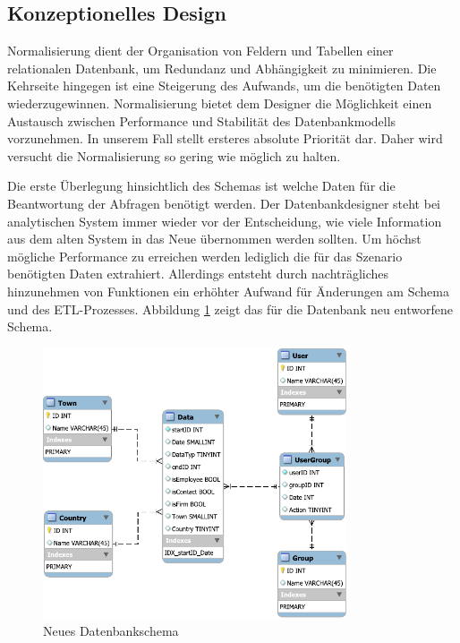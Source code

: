 \subsection{Konzeptionelles Design}

Normalisierung dient der Organisation von Feldern und Tabellen einer relationalen Datenbank, um Redundanz und Abhängigkeit zu minimieren. Die Kehrseite hingegen ist eine Steigerung des Aufwands, um die benötigten Daten wiederzugewinnen. Normalisierung bietet dem Designer die Möglichkeit einen Austausch zwischen Performance und Stabilität des Datenbankmodells vorzunehmen. 
In unserem Fall stellt ersteres absolute Priorität dar. Daher wird versucht die Normalisierung so gering wie möglich zu halten. 

Die erste Überlegung hinsichtlich des Schemas ist welche Daten für die Beantwortung der Abfragen benötigt werden. Der Datenbankdesigner steht bei analytischen System immer wieder vor der Entscheidung, wie viele Information aus dem alten System in das Neue übernommen werden sollten. Um höchst mögliche Performance zu erreichen werden lediglich die für das Szenario benötigten Daten extrahiert. Allerdings entsteht durch nachträgliches hinzunehmen von Funktionen ein erhöhter Aufwand für Änderungen am Schema und des ETL-Prozesses. Abbildung \ref{konzept_SchemaNeu} zeigt das für die Datenbank neu entworfene Schema. 

\begin{figure}[htbp]
\centering
  \includegraphics[width=0.8\textwidth, width=0.8\textwidth]{pics/NewSchema.pdf}
\caption{Neues Datenbankschema}
\label{konzept_SchemaNeu}
\end{figure} 

